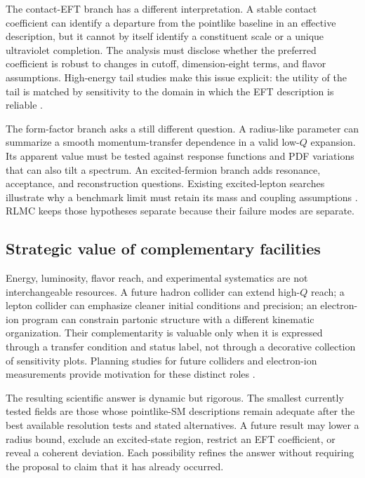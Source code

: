 The contact-EFT branch has a different interpretation. A stable contact coefficient can identify a departure from the pointlike baseline in an effective description, but it cannot by itself identify a constituent scale or a unique ultraviolet completion. The analysis must disclose whether the preferred coefficient is robust to changes in cutoff, dimension-eight terms, and flavor assumptions. High-energy tail studies make this issue explicit: the utility of the tail is matched by sensitivity to the domain in which the EFT description is reliable \cite{allwicher2023}.

The form-factor branch asks a still different question. A radius-like parameter can summarize a smooth momentum-transfer dependence in a valid low-$Q$ expansion. Its apparent value must be tested against response functions and PDF variations that can also tilt a spectrum. An excited-fermion branch adds resonance, acceptance, and reconstruction questions. Existing excited-lepton searches illustrate why a benchmark limit must retain its mass and coupling assumptions \cite{cms_tau2025}. RLMC keeps those hypotheses separate because their failure modes are separate.

\subsection{Strategic value of complementary facilities}

Energy, luminosity, flavor reach, and experimental systematics are not interchangeable resources. A future hadron collider can extend high-$Q$ reach; a lepton collider can emphasize cleaner initial conditions and precision; an electron-ion program can constrain partonic structure with a different kinematic organization. Their complementarity is valuable only when it is expressed through a transfer condition and status label, not through a decorative collection of sensitivity plots. Planning studies for future colliders and electron-ion measurements provide motivation for these distinct roles \cite{abada2019,arrington2021}.

The resulting scientific answer is dynamic but rigorous. The smallest currently tested fields are those whose pointlike-SM descriptions remain adequate after the best available resolution tests and stated alternatives. A future result may lower a radius bound, exclude an excited-state region, restrict an EFT coefficient, or reveal a coherent deviation. Each possibility refines the answer without requiring the proposal to claim that it has already occurred.
